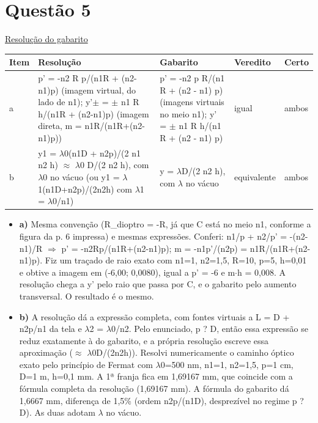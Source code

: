 \documentclass{article}%
\begin{document}
\section*{Questão 5}%
\href{https://poliedroresolve.sistemapoliedro.com.br/vestibulares/ita/2027/ita-2-fase-dia-3-22-10-2026-2-fase-dia-3/dissertativa-5-fisica-2-fase-dia-3-ita-2027}{Resolução do gabarito}\par\smallskip%
\begin{longtable}{@{}p{} p{} p{} p{} p{}@{}}\toprule Item & Resolução & Gabarito & Veredito & Certo \\ \midrule
a & p' = -n2 R p/(n1R + (n2-n1)p) (imagem virtual, do lado de n1); y'$\pm$ = $\pm$ n1 R h/(n1R + (n2-n1)p) (imagem direta, m = n1R/(n1R+(n2-n1)p)) & p' = -n2 p R/(n1 R + (n2 - n1) p) (imagens virtuais no meio n1); y' = $\pm$ n1 R h/(n1 R + (n2 - n1) p) & igual & ambos \\
b & y1 = $\lambda$0(n1D + n2p)/(2 n1 n2 h) $\approx$ $\lambda$0 D/(2 n2 h), com $\lambda$0 no vácuo (ou y1 = $\lambda$1(n1D+n2p)/(2n2h) com $\lambda$1 = $\lambda$0/n1) & y = $\lambda$D/(2 n2 h), com $\lambda$ no vácuo & equivalente & ambos \\
\bottomrule\end{longtable}%
\begin{itemize}%
\item%
\textbf{a)} Mesma convenção (R\_dioptro = -R, já que C está no meio n1, conforme a figura da p. 6 impressa) e mesmas expressões. Conferi: n1/p + n2/p' = -(n2-n1)/R $\Rightarrow$ p' = -n2Rp/(n1R+(n2-n1)p); m = -n1p'/(n2p) = n1R/(n1R+(n2-n1)p). Fiz um traçado de raio exato com n1=1, n2=1,5, R=10, p=5, h=0,01 e obtive a imagem em (-6,00; 0,0080), igual a p' = -6 e m$\cdot$h = 0,008. A resolução chega a y' pelo raio que passa por C, e o gabarito pelo aumento transversal. O resultado é o mesmo.%
\item%
\textbf{b)} A resolução dá a expressão completa, com fontes virtuais a L = D + n2p/n1 da tela e $\lambda$2 = $\lambda$0/n2. Pelo enunciado, p ? D, então essa expressão se reduz exatamente à do gabarito, e a própria resolução escreve essa aproximação ($\approx$ $\lambda$0D/(2n2h)). Resolvi numericamente o caminho óptico exato pelo princípio de Fermat com $\lambda$0=500 nm, n1=1, n2=1,5, p=1 cm, D=1 m, h=0,1 mm. A 1ª franja fica em 1,69167 mm, que coincide com a fórmula completa da resolução (1,69167 mm). A fórmula do gabarito dá 1,6667 mm, diferença de 1,5\% (ordem n2p/(n1D), desprezível no regime p ? D). As duas adotam $\lambda$ no vácuo.%
\end{itemize}%
\end{document}
